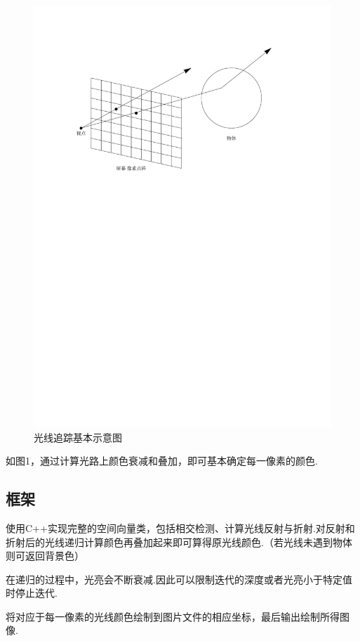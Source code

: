 \documentclass[10pt,twocolumn]{article}
\begin{document}
\begin{figure}[!ht]
\centering
\includegraphics[scale=.55]{fig1.pdf}
\caption{光线追踪基本示意图}
\end{figure}

如图1，通过计算光路上颜色衰减和叠加，即可基本确定每一像素的颜色.

\subsection{\hei 框架}
使用C++实现完整的空间向量类，包括相交检测、计算光线反射与折射.对反射和折射后的光线递归计算颜色再叠加起来即可算得原光线颜色.（若光线未遇到物体则可返回背景色）

在递归的过程中，光亮会不断衰减.因此可以限制迭代的深度或者光亮小于特定值时停止迭代.

将对应于每一像素的光线颜色绘制到图片文件的相应坐标，最后输出绘制所得图像.
\end{document}
